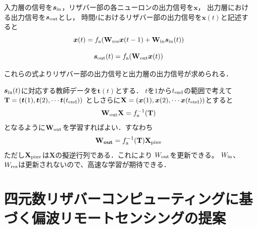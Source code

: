 \documentclass[uplatex,a4paper,10pt]{jsarticle}
\begin{document}
入力層の信号を$\bm{s}_{\rm{in}}$，リザバー部の各ニューロンの出力信号を$\bm{x}$，
出力層における出力信号を$\bm{s}_{\rm{out}}$とし，
時間$t$におけるリザバー部の出力信号を$\bm{x}(t)$と記述すると
\begin{equation}\label{equa:5}
    \bm{x}(t) = f_{\rm{a}}(\mathbf{W_{\rm{res}}} \bm{x}(t-1) + \mathbf{W}_{\rm{in}} \bm{s}_{\rm{in}}(t))
\end{equation}

\begin{equation}\label{equa:6}
    \bm{s}_{\rm{out}}(t) = f_{\rm{a}}(\mathbf{W}_{\rm{out}} \bm{x}(t))
\end{equation}

これらの式よりリザバー部の出力信号と出力層の出力信号が求められる．

$\bm{s}_{\rm{in}}(t)$に対応する教師データを$\bm{t}(t)$とする．
$t$を$1$から$t_{\rm{end}}$の範囲で考えて
$\mathbf{T}=(\bm{t}(1), \bm{t}(2), \cdots \bm{t}(t_{\rm{end}}))$
としさらに$\mathbf{X}=(\bm{x}(1), \bm{x}(2), \cdots \bm{x}(t_{\rm{end}}))$とすると
\begin{equation}\label{equa:7}
    \mathbf{W}_{\rm{out}} \mathbf{X} = f_{\rm{a}}^{-1}(\mathbf{T})
\end{equation}
となるように$\mathbf{W}_{\rm{out}}$を学習すればよい．すなわち
\begin{equation}\label{equa:8}
    \mathbf{W_{out}}=f_{\rm{a}}^{-1}(\mathbf{T}) \mathbf{X}_{\rm{pinv}}
\end{equation}
ただし$\mathbf{X}_{\rm{pinv}}$は$\mathbf{X}$の擬逆行列である．これにより
$W_{\rm{out}}$を更新できる。
$W_{\rm{in}}$、$W_{\rm{res}}$は更新されないので、高速な学習が期待できる．


\section{四元数リザバーコンピューティングに基づく偏波リモートセンシングの提案}
\end{document}
